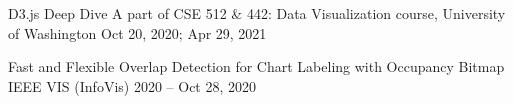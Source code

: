 \begin{cvpubs}
  \cvpub
    {D3.js Deep Dive} %
    {A part of CSE 512 \& 442: Data Visualization course, University of Washington} %
    {Oct 20, 2020; Apr 29, 2021} %
    {} %
    
  \cvpub
    {Fast and Flexible Overlap Detection for Chart Labeling with Occupancy Bitmap} %
    {IEEE VIS (InfoVis) 2020  --  \href{https://youtu.be/bi6FfsWV_9k?t=1318}{\underline{}}} %
    {Oct 28, 2020} %
    {} %

\end{cvpubs}
